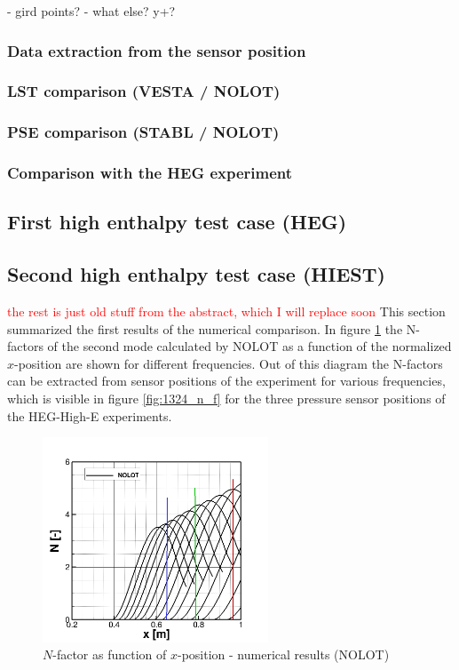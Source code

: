 \documentclass[]{aiaa-tc}%
\begin{document}
- gird points?
- what else? y+? 
\subsubsection{Data extraction from the sensor position}
\subsubsection{LST comparison (VESTA / NOLOT)}
\subsubsection{PSE comparison (STABL / NOLOT)}
\subsubsection{Comparison with the HEG experiment}

\subsection{First high enthalpy test case (HEG)}\label{sect:high_enthalpy}

\subsection{Second high enthalpy test case (HIEST)}\label{sect:high_enthalpy}

\textcolor{red}{the rest is just old stuff from the abstract, which I will replace soon}
This section summarized the first results of the numerical comparison. In figure \ref{fig:1324_n_x} the N-factors of the second mode calculated by NOLOT as a function of the normalized $x$-position are shown for different frequencies. Out of this diagram the N-factors can be extracted from sensor positions of the experiment for various frequencies, which is visible in figure \ref{fig:1324_n_f} for the three pressure sensor positions of the HEG-High-E experiments. 

\begin{figure}[htbp]
	\centering
\includegraphics[width=0.6\textwidth]{pics/2018_1324_nolot_n_x.jpg}
	\caption{$N$-factor as function of $x$-position - numerical results (NOLOT)}
	\label{fig:1324_n_x}
\end{figure}
\end{document}
